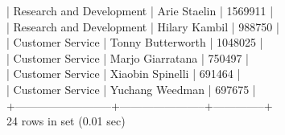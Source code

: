 \documentclass[]{article}
\begin{document}
\begin{enumerate}
| Research and Development | Arie Staelin          |      1569911 |
\\
| Research and Development | Hilary Kambil         |       988750 |
\\
| Customer Service         | Tonny Butterworth     |      1048025 |
\\
| Customer Service         | Marjo Giarratana      |       750497 |
\\
| Customer Service         | Xiaobin Spinelli      |       691464 |
\\
| Customer Service         | Yuchang Weedman       |       697675 |
\\
+--------------------------+-----------------------+--------------+
\\
24 rows in set (0.01 sec)
\end{enumerate}
\end{document}
